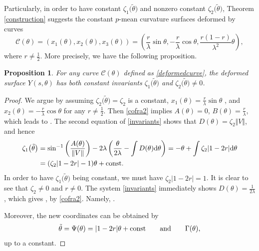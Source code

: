\documentclass[10pt,a4paper]{amsart}
\numberwithin{equation}{section}
\newtheorem{Proposition}[Theorem]{Proposition}
\begin{document}
Particularly, in order to have constant $\zeta_1\bigl(\tilde \theta\bigr)$ and nonzero
constant $\zeta_2\bigl(\tilde \theta\bigr)$, Theorem \ref{construction} suggests the
constant $p$-mean curvature surfaces deformed by curves
\begin{equation} \label{deformedcurve}
\mathcal{C}(\theta)=(x_{1}(\theta),x_{2}(\theta),x_{3}(\theta))=\left(\frac{r}{
\lambda}\sin{\theta},-\frac{r}{\lambda}\cos{\theta},\frac{r(1-r)}{\lambda^2}
\theta\right),
\end{equation}
where $r\neq \frac{1}{2}$. More precisely, we have the following proposition.

\begin{Proposition}
\label{c2value} For any curve $\mathcal{C}(\theta)$ defined as
\eqref{deformedcurve}, the deformed surface $Y(s,\theta)$ has both constant
invariants $\zeta_1\bigl(\tilde \theta\bigr)$ and $\zeta_2\bigl(\tilde \theta\bigr)\neq 0$.
\end{Proposition}

\begin{proof}
We argue by assuming $\zeta_2\bigl(\tilde \theta\bigr)=\zeta_2$ is a constant, $
x_{1}(\theta)=\frac{r}{\lambda}\sin{\theta}$ , and $x_{2}(\theta)=-\frac{r}{
\lambda}\cos{\theta}$ for any $r\neq \frac{1}{2}$. Then \eqref{cofra2}
implies $A(\theta)=0$, $B(\theta)=\frac{r}{\lambda}$, which leads to
.
The second equation of \eqref{invariants} shows that $D(\theta)=\zeta_2
\Vert V \Vert $, and hence
\begin{align*}
\zeta_1\bigl(\tilde \theta\bigr)&= \sin^{-1}\left(\frac{A(\theta)}{\Vert V
\Vert }\right)-2\lambda \left(\frac{\theta}{2\lambda}-\int D(\theta) {\rm d}\theta
\right) =-\theta+\int \zeta_2|1-2r|{\rm d}\theta \\
&=(\zeta_2|1-2r|-1)\theta+\text{\rm const}.
\end{align*}
In order to have $\zeta_1\bigl(\tilde \theta\bigr)$ being constant, we must have
$
\zeta_2|1-2r|=1$.
It is clear to see that $\zeta_2\neq 0$ and $r\neq 0$. The system
\eqref{invariants} immediately shows $D(\theta)=\frac{1}{2\lambda}$, which
gives
,
by \eqref{cofra2}. Namely, .

Moreover, the new coordinates can be obtained by
\[
\tilde \theta=\Psi(\theta)=|1-2r|\theta+\text{\rm const}\qquad \text{and} \qquad
\Gamma(\theta),\]
up to a constant.
\end{proof}
\end{document}
